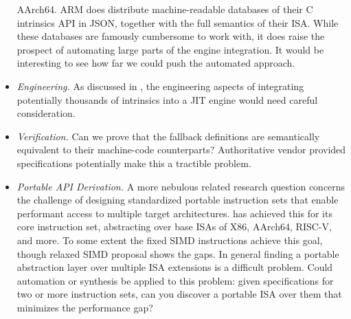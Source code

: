 \begin{itemize}
        AArch64. ARM does distribute machine-readable databases of their C
        intrinsics API in JSON, together with the full semantics of their ISA.
        While these databases are famously cumbersome to work with, it does
        raise the prospect of automating large parts of the engine integration.
        It would be interesting to see how far we could push the automated
        approach.
    \item \emph{Engineering.}
        As discussed in , the engineering aspects of
        integrating potentially thousands of intrinsics into a JIT engine would
        need careful consideration.
    \item \emph{Verification.}
        Can we prove that the fallback definitions are semantically equivalent
        to their machine-code counterparts? Authoritative vendor provided
        specifications potentially make this a tractible problem.
    \item \emph{Portable API Derivation.}
        A more nebulous related research question concerns the challenge of
        designing standardized portable instruction sets that enable performant
        access to multiple target architectures.  \wasm has achieved this for
        its core instruction set, abstracting over base ISAs of X86, AArch64,
        RISC-V, and more.  To some extent the fixed SIMD instructions achieve
        this goal, though relaxed SIMD proposal shows the gaps. In general
        finding a portable abstraction layer over multiple ISA extensions is a
        difficult problem.  Could automation or synthesis be applied to this
        problem: given specifications for two or more instruction sets, can you
        discover a portable ISA over them that minimizes the performance gap?
\end{itemize}
